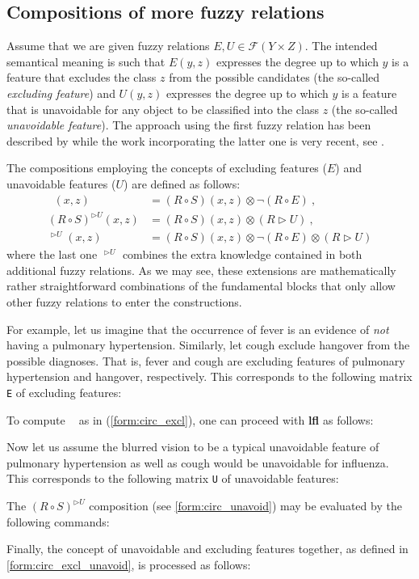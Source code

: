 \documentclass[review]{elsarticle}
\newcommand{\pkg}[1]{\textbf{#1}}
\newcommand{\code}[1]{\texttt{#1}}
\newcommand{\RSE}{\mathop{(R\circ S^{\backprime}E)}\nolimits}
\begin{document}
\subsection{Compositions of more fuzzy relations}

Assume that we are given fuzzy relations $E,U\in\mathcal{F}(Y\times Z)$. The intended semantical meaning is such that $E(y,z)$ expresses the degree up to which $y$ is a feature that excludes the class $z$ from the possible candidates (the so-called \emph{excluding feature}) and $U(y,z)$ expresses the degree up to which $y$ is a feature that is unavoidable for any object to be classified into the class $z$ (the so-called \emph{unavoidable feature}). The approach using the first fuzzy relation has been described by \cite{CaoStep:ExcludfeatureESWA} while the work incorporating the latter one is very recent, see \cite{Step_etal:Unavoidable_KNOSYS2020}.

The compositions employing the concepts of excluding features ($E$) and unavoidable features ($U$) are defined as follows:
\begin{align}
    \RSE(x,z) & = (R\circ S) (x,z) \otimes \neg (R\circ E)\ ,\label{form:circ_excl}\\
    (R\circ S)^{\rhd U}(x,z) & = (R\circ S) (x,z) \otimes  (R\rhd U)\ ,  \label{form:circ_unavoid}\\
    \RSE^{\rhd U}(x,z) & = (R\circ S) (x,z) \otimes \neg (R\circ E) \otimes (R\rhd U)  \label{form:circ_excl_unavoid}
\end{align}
where the last one $\RSE^{\rhd U}$ combines the extra knowledge contained in both additional fuzzy relations. As we may see, these extensions are mathematically rather straightforward combinations of the fundamental blocks that only allow other fuzzy relations to enter the constructions.


For example, let us imagine that the occurrence of fever is an evidence of \emph{not} having a pulmonary hypertension. Similarly, let cough exclude hangover from the possible diagnoses. That is, fever and cough are excluding features of pulmonary hypertension and hangover, respectively. This corresponds to the following matrix \code{E} of excluding features:
%

%
To compute $\RSE$ as in (\ref{form:circ_excl}), one can proceed with \pkg{lfl} as follows:
%

%
Now let us assume the blurred vision to be a typical unavoidable feature of pulmonary hypertension as well as cough would be unavoidable for influenza. This corresponds to the following matrix \code{U} of unavoidable features:
%

%
The $(R\circ S)^{\rhd U}$ composition (see \eqref{form:circ_unavoid}) may be evaluated by the following commands: 
%

%
Finally, the concept of unavoidable and excluding features together, as defined in \eqref{form:circ_excl_unavoid}, is processed as follows:
%

\end{document}
